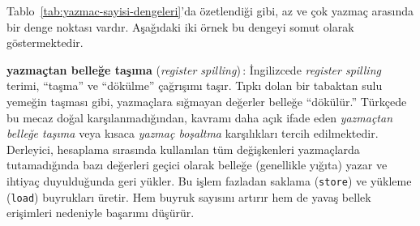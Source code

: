 Tablo~\ref{tab:yazmac-sayisi-dengeleri}'da özetlendiği gibi, az ve çok yazmaç arasında bir denge noktası vardır. Aşağıdaki iki örnek bu dengeyi somut olarak göstermektedir.

\begin{terimnotu}
\textbf{yazmaçtan belleğe taşıma} (\emph{register spilling})\,: İngilizcede \emph{register spilling} terimi, ``taşma'' ve ``dökülme'' çağrışımı taşır. Tıpkı dolan bir tabaktan sulu yemeğin taşması gibi, yazmaçlara sığmayan değerler belleğe ``dökülür.'' Türkçede bu mecaz doğal karşılanmadığından, kavramı daha açık ifade eden \emph{yazmaçtan belleğe taşıma} veya kısaca \emph{yazmaç boşaltma} karşılıkları tercih edilmektedir. Derleyici, hesaplama sırasında kullanılan tüm değişkenleri yazmaçlarda tutamadığında bazı değerleri geçici olarak belleğe (genellikle yığıta) yazar ve ihtiyaç duyulduğunda geri yükler. Bu işlem fazladan saklama (\texttt{store}) ve yükleme (\texttt{load}) buyrukları üretir. Hem buyruk sayısını artırır hem de yavaş bellek erişimleri nedeniyle başarımı düşürür.
\end{terimnotu}

